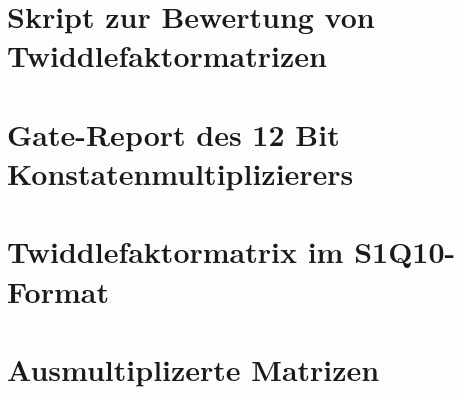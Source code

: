  \section{Skript zur Bewertung von Twiddlefaktormatrizen}
 
 \section{Gate-Report des 12 Bit Konstatenmultiplizierers}
 

 \section{Twiddlefaktormatrix im S1Q10-Format}
 
 
 
 
 
 
 
 \section{Ausmultiplizerte Matrizen}
 
 
